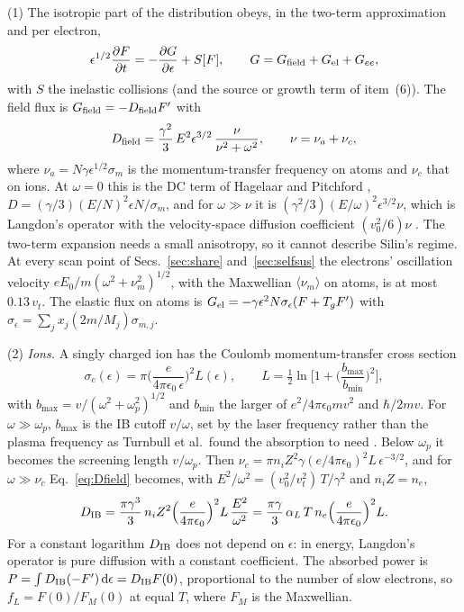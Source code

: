 \documentclass[11pt]{article}
\numberwithin{equation}{section}
\newcommand{\dd}{\mathrm d}
\begin{document}
{\noindent}(1) The isotropic part of the distribution obeys, in the two-term
approximation and per electron,
\begin{equation}
\epsilon^{1/2}\frac{\partial F}{\partial t}=-\frac{\partial G}{\partial\epsilon}+S[F],\qquad
G=G_{\rm field}+G_{\rm el}+G_{ee},
\label{eq:kinetic}
\end{equation}
with $S$ the inelastic collisions (and the source or growth term of item~(6)). The
field flux is $G_{\rm field}=-D_{\rm field}F'$ with
\begin{equation}
D_{\rm field}=\frac{\gamma^2}{3}\,E^2\epsilon^{3/2}\,\frac{\nu}{\nu^2+\omega^2},\qquad
\nu=\nu_a+\nu_c,
\label{eq:Dfield}
\end{equation}
where $\nu_a=N\gamma\epsilon^{1/2}\sigma_m$ is the momentum-transfer frequency on
atoms and $\nu_c$ that on ions. At $\omega=0$ this is the DC term of Hagelaar and
Pitchford \cite{HP2005}, $D=(\gamma/3)(E/N)^2\epsilon N/\sigma_m$, and for
$\omega\gg\nu$ it is $(\gamma^2/3)(E/\omega)^2\epsilon^{3/2}\nu$, which is Langdon's
operator with the velocity-space diffusion coefficient $(v_0^2/6)\nu$
\cite{Langdon1980}. The two-term expansion needs a small anisotropy, so it cannot describe
Silin's regime. At every scan point of Secs.~\ref{sec:share} and~\ref{sec:selfsus}
the electrons' oscillation velocity $eE_0/m(\omega^2+\nu_m^2)^{1/2}$, with the
Maxwellian $\langle\nu_m\rangle$ on atoms, is at most $0.13\,v_t$. The elastic flux on atoms is
$G_{\rm el}=-\gamma\epsilon^2N\sigma_\epsilon(F+T_gF')$ with
$\sigma_\epsilon=\sum_jx_j(2m/M_j)\sigma_{m,j}$.

{\noindent}(2) \emph{Ions.} A singly charged ion has the Coulomb
momentum-transfer cross section
\begin{equation}
\sigma_c(\epsilon)=\pi\Big(\frac{e}{4\pi\epsilon_0\,\epsilon}\Big)^2L(\epsilon),\qquad
L=\tfrac12\ln\!\Big[1+\Big(\frac{b_{\max}}{b_{\min}}\Big)^2\Big],
\label{eq:sigc}
\end{equation}
with $b_{\max}=v/(\omega^2+\omega_p^2)^{1/2}$ and $b_{\min}$ the larger of
$e^2/4\pi\epsilon_0mv^2$ and $\hbar/2mv$. For $\omega\gg\omega_p$, $b_{\max}$ is the IB
cutoff $v/\omega$, set by the laser frequency rather than the plasma frequency as
Turnbull et al.\ found the absorption to need \cite{Turnbull2023}. Below $\omega_p$ it
becomes the screening length $v/\omega_p$. Then
$\nu_c=\pi n_iZ^2\gamma(e/4\pi\epsilon_0)^2L\,\epsilon^{-3/2}$, and for
$\omega\gg\nu_c$ Eq.~\eqref{eq:Dfield} becomes, with
$E^2/\omega^2=(v_0^2/v_t^2)\,T/\gamma^2$ and $n_iZ=n_e$,
\begin{equation}
D_{\rm IB}=\frac{\pi\gamma^3}{3}\,n_iZ^2\Big(\frac{e}{4\pi\epsilon_0}\Big)^2L\,\frac{E^2}{\omega^2}
=\frac{\pi\gamma}{3}\,\alpha_L\,T\,n_e\Big(\frac{e}{4\pi\epsilon_0}\Big)^2L.
\label{eq:DIB}
\end{equation}
For a constant logarithm $D_{\rm IB}$ does not depend on $\epsilon$: in energy,
Langdon's operator is pure diffusion with a constant coefficient. The absorbed
power is $P=\int D_{\rm IB}(-F')\,\dd\epsilon=D_{\rm IB}F(0)$, proportional to the
number of slow electrons, so $f_L=F(0)/F_M(0)$ at equal $T$, where $F_M$ is the
Maxwellian.
\end{document}
